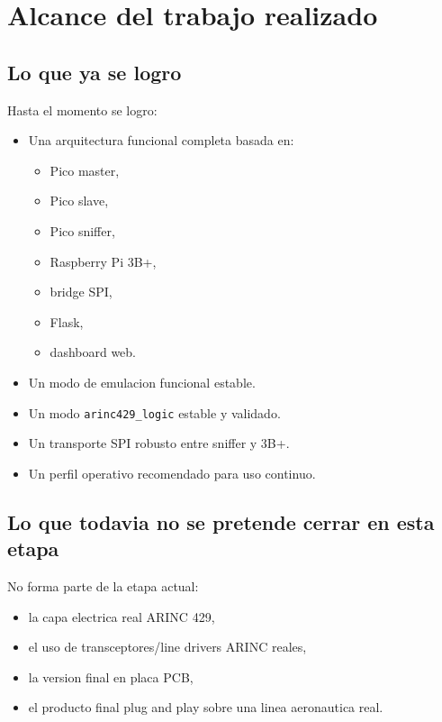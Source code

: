 \documentclass[12pt,a4paper,oneside]{report}
\begin{document}
\chapter{Alcance del trabajo realizado}

\section{Lo que ya se logro}

Hasta el momento se logro:

\begin{itemize}[leftmargin=1.2cm]
    \item Una arquitectura funcional completa basada en:
    \begin{itemize}
        \item Pico master,
        \item Pico slave,
        \item Pico sniffer,
        \item Raspberry Pi 3B+,
        \item bridge SPI,
        \item Flask,
        \item dashboard web.
    \end{itemize}
    \item Un modo de emulacion funcional estable.
    \item Un modo \texttt{arinc429\_logic} estable y validado.
    \item Un transporte SPI robusto entre sniffer y 3B+.
    \item Un perfil operativo recomendado para uso continuo.
\end{itemize}

\section{Lo que todavia no se pretende cerrar en esta etapa}

No forma parte de la etapa actual:

\begin{itemize}[leftmargin=1.2cm]
    \item la capa electrica real ARINC 429,
    \item el uso de transceptores/line drivers ARINC reales,
    \item la version final en placa PCB,
    \item el producto final plug and play sobre una linea aeronautica real.
\end{itemize}
\end{document}
